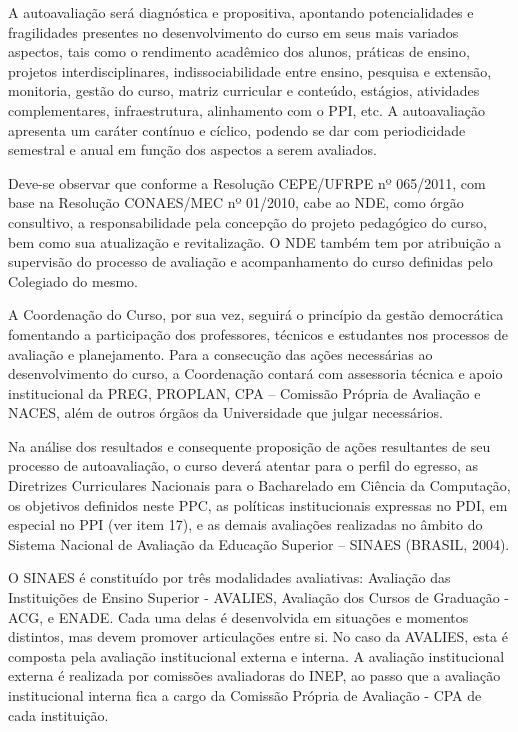 \documentclass[
	12pt,				%
	openright,			%
  oneside,     %
	a4paper,			%
	chapter=TITLE,		%
	english,			%
	french,				%
	spanish,			%
	brazil				%
	]{abntex2}
\begin{document}
A autoavaliação será diagnóstica e propositiva, apontando potencialidades e fragilidades presentes no desenvolvimento do curso em seus mais variados aspectos, tais como o rendimento acadêmico dos alunos, práticas de ensino, projetos interdisciplinares, indissociabilidade entre ensino, pesquisa e extensão, monitoria, gestão do curso, matriz curricular e conteúdo, estágios, atividades complementares, infraestrutura, alinhamento com o PPI, etc. A autoavaliação apresenta um caráter contínuo e cíclico, podendo se dar com periodicidade semestral e anual em função dos aspectos a serem avaliados.

Deve-se observar que conforme a Resolução CEPE/UFRPE nº 065/2011, com base na Resolução CONAES/MEC nº 01/2010, cabe ao NDE, como órgão consultivo, a responsabilidade pela concepção do projeto pedagógico do curso, bem como sua atualização e revitalização. O NDE também tem por atribuição a supervisão do processo de avaliação e acompanhamento do curso definidas pelo Colegiado do mesmo.

A Coordenação do Curso, por sua vez, seguirá o princípio da gestão democrática fomentando a participação dos professores, técnicos e estudantes nos processos de avaliação e planejamento. Para a consecução das ações necessárias ao desenvolvimento do curso, a Coordenação contará com assessoria técnica e apoio institucional da PREG, PROPLAN, CPA – Comissão Própria de Avaliação e NACES, além de outros órgãos da Universidade que julgar necessários.

Na análise dos resultados e consequente proposição de ações resultantes de seu processo de autoavaliação, o curso deverá atentar para o perfil do egresso, as Diretrizes Curriculares Nacionais para o Bacharelado em Ciência da Computação, os objetivos definidos neste PPC, as políticas institucionais expressas no PDI, em especial no PPI (ver item 17), e as demais avaliações realizadas no âmbito do Sistema Nacional de Avaliação da Educação Superior – SINAES (BRASIL, 2004).

O SINAES é constituído por três modalidades avaliativas: Avaliação das Instituições de Ensino Superior - AVALIES, Avaliação dos Cursos de Graduação - ACG, e ENADE. Cada uma delas é desenvolvida em situações e momentos distintos, mas devem promover articulações entre si. No caso da AVALIES, esta é composta pela avaliação institucional externa e interna. A avaliação institucional externa é realizada por comissões avaliadoras do INEP, ao passo que a avaliação institucional interna fica a cargo da Comissão Própria de Avaliação - CPA de cada instituição.
\end{document}
